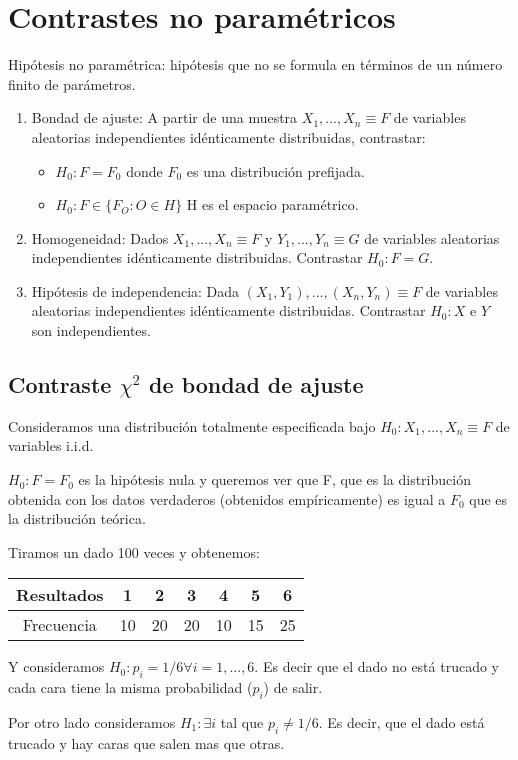 \section{Contrastes no paramétricos}
Hipótesis no paramétrica: hipótesis que no se formula en términos de un número finito de parámetros.

\begin{enumerate}
\item Bondad de ajuste: A partir de una muestra $X_1,...,X_n \equiv F$ de variables aleatorias independientes idénticamente distribuidas, contrastar:
\begin{itemize}
\item $H_0: F=F_0$ donde $F_0$ es una distribución prefijada.
\item $H_0: F \in \{F_O : O\in H\}$ H es el espacio paramétrico.
\end{itemize}
\item Homogeneidad: Dados $X_1,...,X_n \equiv F$ y $Y_1,...,Y_n \equiv G$ de variables aleatorias independientes idénticamente distribuidas. Contrastar $H_0: F=G$.
\item Hipótesis de independencia: Dada $(X_1,Y_1),...,(X_n,Y_n) \equiv F$ de variables aleatorias independientes idénticamente distribuidas. Contrastar $H_0: X$ e $Y$ son independientes.
\end{enumerate}

\subsection{Contraste $\chi^2$ de bondad de ajuste}
Consideramos una distribución totalmente especificada bajo $H_0: X_1,...,X_n \equiv F$ de variables i.i.d.

$H_0: F=F_0$ es la hipótesis nula y queremos ver que F, que es la distribución obtenida con los datos verdaderos (obtenidos empíricamente) es igual a $F_0$ que es la distribución teórica.

\begin{example}
Tiramos un dado 100 veces y obtenemos:

\begin{tabular}{|c|c|c|c|c|c|c|}
\hline
Resultados & 1 & 2 & 3 & 4 & 5 & 6 \\
\hline
Frecuencia & 10 & 20 & 20 & 10 & 15 & 25\\
\hline
\end{tabular}

Y consideramos $H_0: p_i=1/6 \forall i=1,...,6$. Es decir que el dado no está trucado y cada cara tiene la misma probabilidad ($p_i$) de salir.

Por otro lado consideramos $H_1: \exists i$ tal que $p_i\neq 1/6$. Es decir, que el dado está trucado y hay caras que salen mas que otras.

\end{example}

